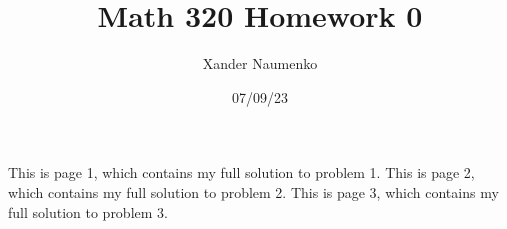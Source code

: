 \documentclass[letterpaper, reqno,11pt]{article}
\begin{document}
\title{Math 320 Homework 0}
\date{07/09/23}
\author{Xander Naumenko}
\maketitle

This is page 1, which contains my full solution to problem 1. 
\newpage
This is page 2, which contains my full solution to problem 2. 
\newpage
This is page 3, which contains my full solution to problem 3. 
\newpage
\end{document}
